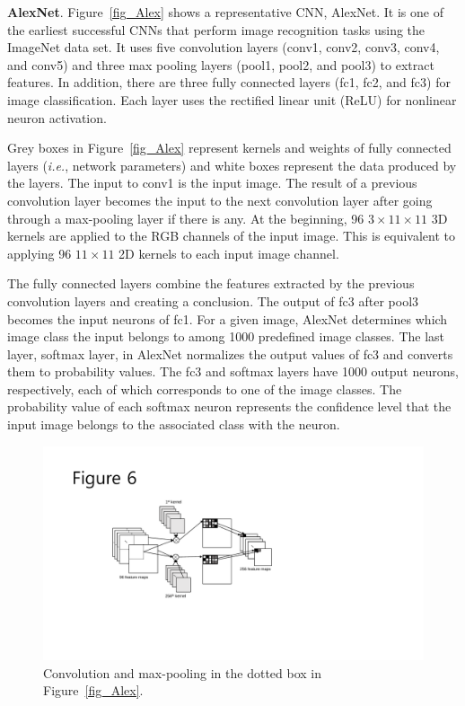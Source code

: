 {\bf AlexNet}. Figure~\ref{fig_Alex} shows a representative CNN, AlexNet\cite{krizhevsky2012imagenet}. It is one of the earliest successful CNNs that perform image recognition tasks using the ImageNet data set\cite{DBLP:journals/corr/RussakovskyDSKSMHKKBBF14}. It uses five convolution layers (\textsf{conv1}, \textsf{conv2}, \textsf{conv3}, \textsf{conv4}, and \textsf{conv5}) and three max pooling layers (\textsf{pool1}, \textsf{pool2}, and \textsf{pool3}) to extract features. In addition, there are three fully connected layers (\textsf{fc1}, \textsf{fc2}, and \textsf{fc3}) for image classification. Each layer uses the rectified linear unit (ReLU) for nonlinear neuron activation. 

Grey boxes in Figure~\ref{fig_Alex} represent kernels and weights of fully connected layers (\textit{i.e.}, network parameters) and white boxes represent the data produced by the layers. The input to \textsf{conv1} is the input image. The result of a previous convolution layer becomes the input to the next convolution layer after going through a max-pooling layer if there is any. At the beginning, 96 $3 \times 11 \times 11$ 3D kernels are applied to the RGB channels of the input image. This is equivalent to applying 96 $11 \times 11$ 2D kernels to each input image channel. 

The fully connected layers combine the features extracted by the previous convolution layers and creating a conclusion. The output of \textsf{fc3} after \textsf{pool3} becomes the input neurons of \textsf{fc1}. For a given image, AlexNet determines which image class the input belongs to among 1000 predefined image classes. The last layer, \textsf{softmax} layer, in AlexNet normalizes the output values of \textsf{fc3} and converts them to probability values. The \textsf{fc3} and \textsf{softmax} layers have 1000 output neurons, respectively, each of which corresponds to one of the image classes. The probability value of each \textsf{softmax} neuron represents the confidence level that the input image belongs to the associated class with the neuron.

\begin{figure}[htbp]
  \centering
  \includegraphics[width=\linewidth]{./figures/convolution}
  \caption{Convolution and max-pooling in the dotted box in Figure~\ref{fig_Alex}.}
  \label{fig_convolution}
\end{figure}

